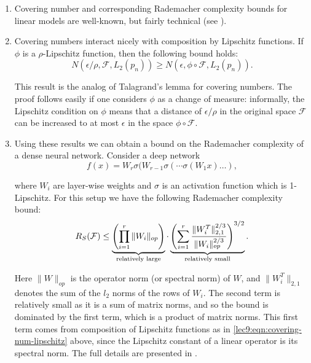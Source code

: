 \begin{enumerate}
\item Covering number and corresponding Rademacher complexity bounds for linear models are well-known, but fairly technical (see \cite{zhang2002}).
    
\item Covering numbers interact nicely with composition by Lipschitz functions. If $\phi$ is a $\rho$-Lipschitz function, then the following bound holds:
\begin{equation}\label{lec9:eqn:covering-num-lipschitz}
N(\epsilon/\rho, \mathcal{F}, L_2({p_n}))\geq N(\epsilon, \phi\circ\mathcal{F}, L_2({p_n})).
\end{equation}
    
This result is the analog of Talagrand's lemma for covering numbers. The proof follows easily if one considers $\phi$ as a change of measure: informally, the Lipschitz condition on $\phi$ means that a distance of $\epsilon/\rho$ in the original space $\mathcal{F}$ can be increased to at most $\epsilon$ in the space $\phi \circ \mathcal{F}$.

\item Using these results we can obtain a bound on the Rademacher complexity of a dense neural network. Consider a deep network
\begin{equation}
f(x) = W_r\sigma(W_{r-1}\sigma(\cdots \sigma(W_1x)\ldots),
\end{equation}

where $W_i$ are layer-wise weights and $\sigma$ is an activation function which is 1-Lipschitz. For this setup we have the following Rademacher complexity bound:
\begin{equation}
R_S (\mathcal F) \leq \underbrace{\left(\prod_{i=1}^r\|W_i\|_{op} \right)}_{\text{relatively large}} \cdot \underbrace{\left( \sum_{i=1}^r\frac{\|W_i^T\|^{2/3}_{2,1}}{\|W_i\|_{op}^{2/3}}\right)^{3/2}}_{\text{relatively small}}.
\end{equation}
        
Here $\|W\|_{op}$ is the operator norm (or spectral norm) of $W$, and $\|W_i^T\|_{2,1}$ denotes the sum of the $l_2$ norms of the rows of $W_i$. The second term is relatively small as it is a sum of matrix norms, and so the bound is dominated by the first term, which is a product of matrix norms. This first term comes from composition of Lipschitz functions as in \eqref{lec9:eqn:covering-num-lipschitz} above, since the Lipschitz constant of a linear operator is its spectral norm. The full details are presented in \cite{bartlett2017}.
\end{enumerate}

